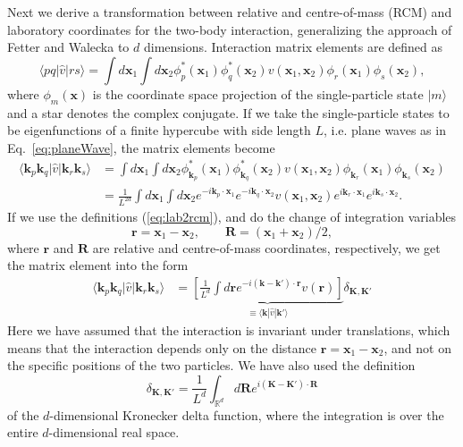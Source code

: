 \documentclass[a4paper,12pt]{report}
\begin{document}
Next we derive a transformation between relative and centre-of-mass (RCM) and laboratory coordinates for the two-body interaction, generalizing the approach of Fetter and Walecka \cite{fetter} to $d$ dimensions. Interaction matrix elements are defined as
\begin{equation}
  \langle pq|\hat{v}|rs\rangle = \int d\mathbf{x}_{1} \int d\mathbf{x}_{2}\phi_{p}^{*}(\mathbf{x}_{1})\phi_{q}^{*}(\mathbf{x}_{2})v(\mathbf{x}_{1}, \mathbf{x}_{2})\phi_{r}(\mathbf{x}_{1})\phi_{s}(\mathbf{x}_{2}),
\end{equation}
where $\phi_{m}(\mathbf{x})$ is the coordinate space projection of the single-particle state $| m\rangle $ and a star denotes the complex conjugate. If we take the single-particle states to be eigenfunctions of a finite hypercube with side length $L$, i.e. plane waves as in Eq.~\ref{eq:planeWave}, the matrix elements become 
\begin{align}
  \langle \mathbf{k}_{p}\mathbf{k}_{q}|\hat{v}|\mathbf{k}_{r}\mathbf{k}_{s}\rangle &= \int d\mathbf{x}_{1}\int d\mathbf{x}_{2}\phi_{\mathbf{k}_{p}}^{*}(\mathbf{x}_{1})\phi_{\mathbf{k}_{q}}^{*}(\mathbf{x}_{2})v(\mathbf{x}_{1}, \mathbf{x}_{2})\phi_{\mathbf{k}_{r}}(\mathbf{x}_{1})\phi_{\mathbf{k}_{s}}(\mathbf{x}_{2}) \nonumber \\
  &= \frac{1}{L^{2d}}\int d\mathbf{x}_{1}\int d\mathbf{x}_{2} e^{-i\mathbf{k}_{p}\cdot \mathbf{x}_{1}}e^{-i\mathbf{k}_{q}\cdot \mathbf{x}_{2}}v(\mathbf{x}_{1}, \mathbf{x}_{2})e^{i\mathbf{k}_{r}\cdot \mathbf{x}_{1}}e^{i\mathbf{k}_{s}\cdot \mathbf{x}_{2}}. 
\end{align}
If we use the definitions (\ref{eq:lab2rcm}), and do the change of integration variables 
\begin{equation}
  \mathbf{r} = \mathbf{x}_{1}-\mathbf{x}_{2}, \qquad \mathbf{R} = (\mathbf{x}_{1}+\mathbf{x}_{2})/2,
\end{equation}
where $\mathbf{r}$ and $\mathbf{R}$ are relative and centre-of-mass coordinates, respectively, we get the matrix element into the form
 \begin{align}
   \langle \mathbf{k}_{p}\mathbf{k}_{q}|\hat{v}|\mathbf{k}_{r}\mathbf{k}_{s}\rangle &=\underbrace{\left[ \frac{1}{L^{d}}\int d\mathbf{r} e^{-i\left( \mathbf{k}-\mathbf{k}'\right) \cdot \mathbf{r}} v(\mathbf{r})\right]}_{\equiv \langle \mathbf{k}|\hat{v}|\mathbf{k}'\rangle} \delta_{\mathbf{K},\mathbf{K}'}  
 \end{align}
Here we have assumed that the interaction is invariant under translations, which means that the interaction depends only on the distance $\mathbf{r} = \mathbf{x}_{1}-\mathbf{x}_{2}$, and not on the specific positions of the two particles. We have also used the definition
\begin{equation}
\delta_{\mathbf{K}, \mathbf{K}'} = \frac{1}{L^{d}}\int_{\mathbb{R}^{d}} d\mathbf{R}e^{i\left(\mathbf{K}-\mathbf{K}'\right)\cdot \mathbf{R}}
\end{equation}
of the $d$-dimensional Kronecker delta function, where the integration is over the entire $d$-dimensional real space.~\cite{fetter}
\end{document}
